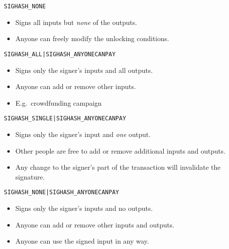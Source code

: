 \documentclass[handout]{beamer}
\begin{document}
\begin{frame}{\texttt{SIGHASH\_NONE}}
	\begin{figure}
			
	\end{figure}
	\begin{itemize}
		\item Signs all inputs but \emph{none} of the outputs.
		\item Anyone can freely modify the unlocking conditions.
	\end{itemize}
\end{frame}

\begin{frame}{\texttt{SIGHASH\_ALL|SIGHASH\_ANYONECANPAY}}
	\begin{figure}
		
	\end{figure}
	\begin{itemize}
		\item Signs only the signer's inputs and all outputs.
		\item Anyone can add or remove other inputs.
		\item E.g.\ crowdfunding campaign
	\end{itemize}
\end{frame}

\begin{frame}{\texttt{SIGHASH\_SINGLE|SIGHASH\_ANYONECANPAY}}
	\begin{figure}
			
	\end{figure}
	\begin{itemize}
		\item Signs only the signer's input and \emph{one} output.
		\item Other people are free to add or remove additional inputs and outputs.\\
		\item Any change to the signer's part of the transaction will invalidate the signature.	
	\end{itemize}
\end{frame}

\begin{frame}{\texttt{SIGHASH\_NONE|SIGHASH\_ANYONECANPAY}}
	\begin{figure}
		
	\end{figure}
	\begin{itemize}
		\item Signs only the signer's inputs and no outputs.
		\item Anyone can add or remove other inputs and outputs.
		\item Anyone can use the signed input in any way.	
	\end{itemize}
\end{frame}
\end{document}
